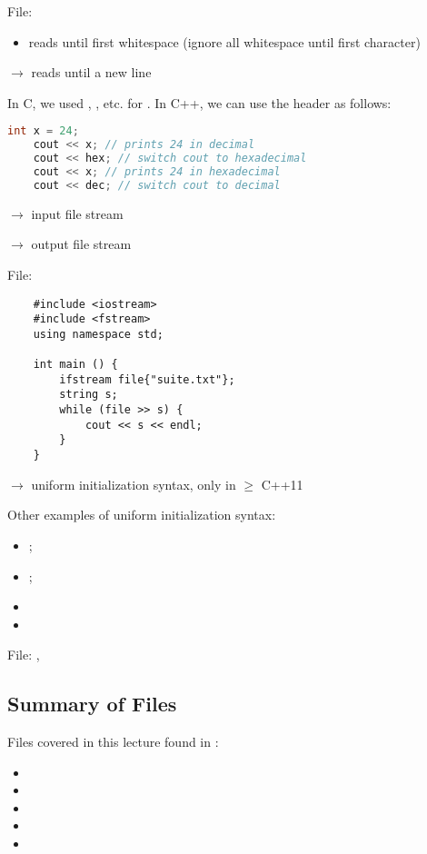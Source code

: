 File: 
\begin{itemize}
    \item reads until first whitespace (ignore all whitespace until first
    character)
\end{itemize}
 $ \rightarrow $ reads until a new line

In C, we used , , etc. for . In C++, we
can use the  header as follows:
\begin{lstlisting}[language = C++]
    int x = 24;
    cout << x; // prints 24 in decimal
    cout << hex; // switch cout to hexadecimal
    cout << x; // prints 24 in hexadecimal
    cout << dec; // switch cout to decimal
\end{lstlisting}

 $ \rightarrow $ input file stream

 $ \rightarrow $ output file stream

File: 
\begin{lstlisting}
    #include <iostream>
    #include <fstream>
    using namespace std;
    
    int main () {
        ifstream file{"suite.txt"};
        string s;
        while (file >> s) {
            cout << s << endl;
        }
    }
\end{lstlisting}
$ \rightarrow $ uniform initialization syntax, only in $ \ge $ C++11

Other examples of uniform initialization syntax:
\begin{itemize}
    \item {};
    \item {};
\end{itemize}

\begin{itemize}
    \item {}
    \item {}
\end{itemize}

File: , 

\subsection{Summary of Files}
Files covered in this lecture found in :
\begin{itemize}
    \item {}
    \item {}
    \item {}
    \item {}
    \item {}
\end{itemize}